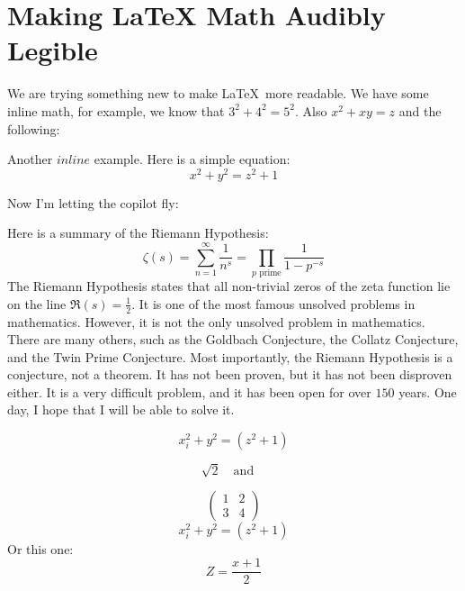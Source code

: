 \documentclass{article}
\newcommand{\mymat}[1]{\begin{pmatrix} #1 \end{pmatrix}}
\begin{document}
\section{Making \LaTeX{} Math Audibly Legible}

We are trying something new to make \LaTeX\ more readable. We have some inline math, for example, we know that \(3^2 + 4^2 = 5^{2}\). Also \(x^2 + xy = z\) and the following:

Another \(inline\) example. Here is a simple equation:
\[
      x^2 + y^2 = z^2 + 1 
\]

Now I'm letting the copilot fly:

Here is a summary of the Riemann Hypothesis: 
\[
    \zeta(s) = \sum_{n=1}^{\infty} \frac{1}{n^s} = \prod_{p \text{ prime}} \frac{1}{1 - p^{-s}}
\]
The Riemann Hypothesis states that all non-trivial zeros of the zeta function
lie on the line \(\Re(s) = \frac{1}{2}\). It is one of the most famous unsolved
problems in mathematics. However, it is not the only unsolved problem in
mathematics. There are many others, such as the Goldbach Conjecture, the Collatz
Conjecture, and the Twin Prime Conjecture. Most importantly, the Riemann
Hypothesis is a conjecture, not a theorem. It has not been proven, but it has
not been disproven either. It is a very difficult problem, and it has been open
for over \(15\)0 years. One day, I hope that I will be able to solve it.

\begin{equation}
       x_i^2 + y^2 = (z^2 + 1)
    \end{equation}

        \[\sqrt{2}
         \quad \text{and} \quad   \]


    \begin{equation*}
        \mymat{ 1 & 2 \\ 3 & 4 }
     \end{equation*} 
\begin{equation}
    x_i^2 + y^2 = (z^2 + 1)
 \end{equation}
Or this one:
    \[
       Z = \frac{x+1}{2}
    \]
\end{document}
